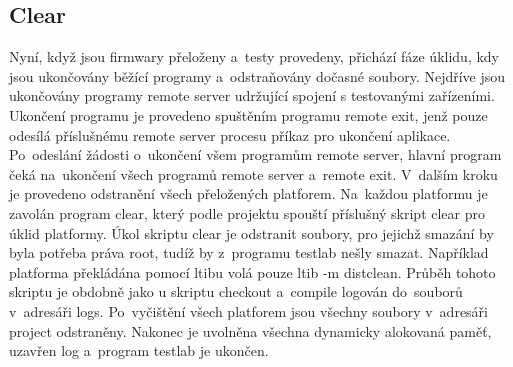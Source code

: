 \subsection{Clear}
Nyní, když jsou firmwary přeloženy a~testy provedeny, přichází fáze úklidu, kdy jsou ukončovány běžící programy a~odstraňovány dočasné soubory. Nejdříve jsou ukončovány programy remote server udržující spojení s testovanými zařízeními. Ukončení programu je provedeno spuštěním programu remote exit, jenž pouze odesílá příslušnému remote server procesu příkaz pro ukončení aplikace. Po~odeslání žádosti o~ukončení všem programům remote server, hlavní program čeká na~ukončení všech programů remote server a~remote exit. V~dalším kroku je provedeno odstranění všech přeložených platforem. Na~každou platformu je zavolán program clear, který podle projektu spouští příslušný skript clear pro úklid platformy. Úkol skriptu clear je odstranit soubory, pro jejichž smazání by byla potřeba práva root, tudíž by z~programu testlab nešly smazat. Například platforma překládána pomocí ltibu volá pouze ltib -m distclean. Průběh tohoto skriptu je obdobně jako u skriptu checkout a~compile logován do~souborů v~adresáři logs. Po~vyčištění všech platforem jsou všechny soubory v~adresáři project odstraněny. Nakonec je uvolněna všechna dynamicky alokovaná paměť, uzavřen log a~program testlab je ukončen.

\endinput
